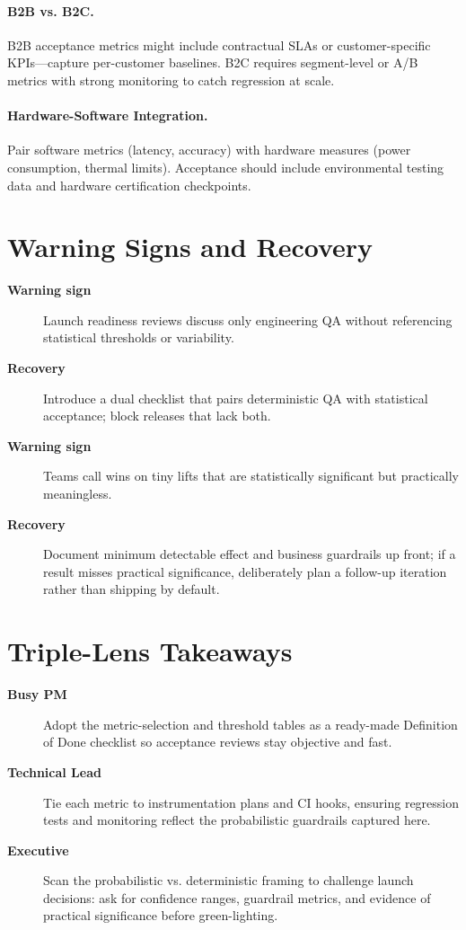 \paragraph{B2B vs. B2C.} B2B acceptance metrics might include contractual SLAs or customer-specific KPIs—capture per-customer baselines. B2C requires segment-level or A/B metrics with strong monitoring to catch regression at scale.

\paragraph{Hardware-Software Integration.} Pair software metrics (latency, accuracy) with hardware measures (power consumption, thermal limits). Acceptance should include environmental testing data and hardware certification checkpoints.
\section{Warning Signs and Recovery}
\label{sec:stats-warning}
\begin{description}
    \item[\textbf{Warning sign}] Launch readiness reviews discuss only engineering QA without referencing statistical thresholds or variability.
    \item[\textbf{Recovery}] Introduce a dual checklist that pairs deterministic QA with statistical acceptance; block releases that lack both.
    \item[\textbf{Warning sign}] Teams call wins on tiny lifts that are statistically significant but practically meaningless.
    \item[\textbf{Recovery}] Document minimum detectable effect and business guardrails up front; if a result misses practical significance, deliberately plan a follow-up iteration rather than shipping by default.
\end{description}

\section{Triple-Lens Takeaways}
\label{sec:stats-acceptance-triple}

\begin{description}
    \item[\textbf{Busy PM}] Adopt the metric-selection and threshold tables as a ready-made Definition of Done checklist so acceptance reviews stay objective and fast.
    \item[\textbf{Technical Lead}] Tie each metric to instrumentation plans and CI hooks, ensuring regression tests and monitoring reflect the probabilistic guardrails captured here.
    \item[\textbf{Executive}] Scan the probabilistic vs. deterministic framing to challenge launch decisions: ask for confidence ranges, guardrail metrics, and evidence of practical significance before green-lighting.
\end{description}
